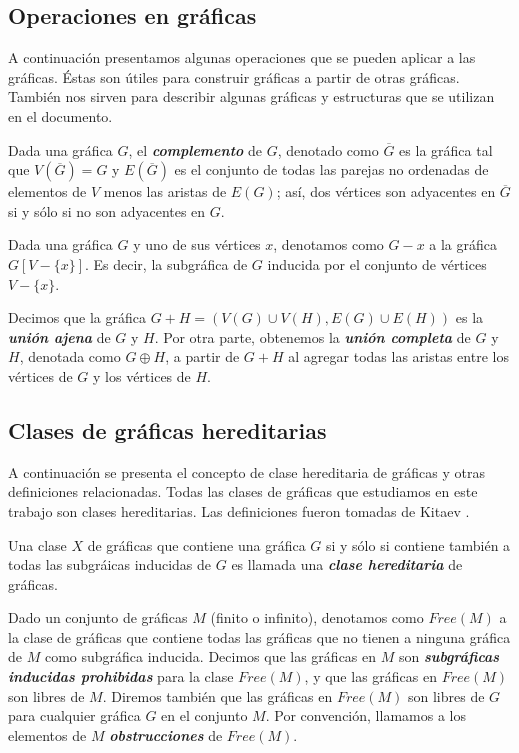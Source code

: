 \subsection{Operaciones en gráficas}

A continuación presentamos algunas operaciones que se pueden aplicar a las gráficas. Éstas son útiles para construir gráficas a partir de otras gráficas. También nos sirven para describir algunas gráficas y estructuras que se utilizan en el documento.

Dada una gráfica $G$, el \textbf{\emph{complemento}} de $G$, denotado como $\overline{G}$ es la gráfica tal que $V(\overline{G}) = G$ y $E(\overline{G})$ es el conjunto de todas las parejas no ordenadas de elementos de $V$ menos las aristas de $E(G)$; así, dos vértices son adyacentes en $\overline{G}$ si y sólo si no son adyacentes en $G$.

 Dada una gráfica $G$ y uno de sus vértices $x$, denotamos como $G - x $ a la gráfica $G[V-\{x\}]$. Es decir, la subgráfica de $G$ inducida por el conjunto de vértices $V-\{x\}$.

Decimos que la gráfica $G + H = (V(G)\cup V(H), E(G)\cup E(H))$ es la \textbf{\emph{unión ajena}} de $G$ y $H$. Por otra parte, obtenemos la \textbf{\emph{unión completa}} de $G$ y $H$, denotada como $G \oplus H$, a partir de $G + H$ al agregar todas las aristas entre los vértices de $G$ y los vértices de $H$.

\subsection{Clases de gráficas hereditarias}

A continuación se presenta el concepto de clase hereditaria de gráficas y otras definiciones relacionadas. Todas las clases de gráficas que estudiamos en este trabajo son clases hereditarias.  Las definiciones fueron tomadas de Kitaev \cite{Kitaev}.

Una clase $X$ de gráficas que contiene una gráfica $G$ si y sólo si contiene también a todas las subgráicas inducidas de $G$ es llamada una \textbf{\emph{clase hereditaria}} de gráficas.

Dado un conjunto de gráficas $M$ (finito o infinito), denotamos como $Free(M)$ a la clase de gráficas que contiene todas las gráficas que no tienen a ninguna gráfica de $M$ como subgráfica inducida. Decimos que las gráficas en $M$ son \textbf{\emph{subgráficas inducidas prohibidas}} para la clase $Free(M)$, y que las gráficas en $Free(M)$ son libres de $M$. Diremos también que las gráficas en $Free(M)$ son libres de $G$ para cualquier gráfica $G$ en el conjunto $M$. Por convención, llamamos a los elementos de $M$ \textbf{\emph{obstrucciones}} de $Free(M)$.

